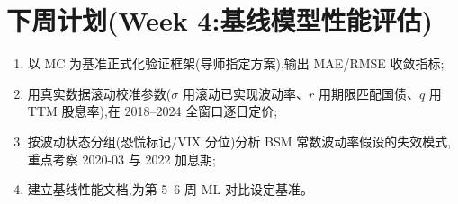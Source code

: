 \documentclass[11pt]{ctexart}
\begin{document}
\section{下周计划(Week 4:基线模型性能评估)}
\begin{enumerate}
  \item 以 MC 为基准正式化验证框架(导师指定方案),输出 MAE/RMSE 收敛指标;
  \item 用真实数据滚动校准参数($\sigma$ 用滚动已实现波动率、$r$ 用期限匹配国债、$q$ 用 TTM 股息率),在 2018--2024 全窗口逐日定价;
  \item 按波动状态分组(恐慌标记/VIX 分位)分析 BSM 常数波动率假设的失效模式,重点考察 2020-03 与 2022 加息期;
  \item 建立基线性能文档,为第 5--6 周 ML 对比设定基准。
\end{enumerate}
\end{document}
